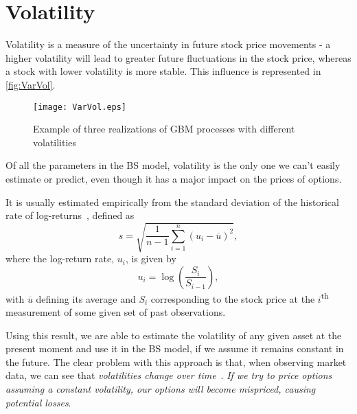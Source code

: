 
\section{Volatility}
\label{sec:vol}
Volatility is a measure of the uncertainty in future stock price movements - a higher volatility will lead to greater future fluctuations in the stock price, whereas a stock with lower volatility is more stable. This influence is represented in \autoref{fig:VarVol}.
\begin{figure}[H]
    \centering
      \texttt{[image: VarVol.eps]}
      \caption{Example of three realizations of GBM processes with different volatilities}\label{fig:VarVol}
    \end{figure}
    
Of all the parameters in the BS model, volatility is the only one we can't easily estimate or predict, even though it has a major impact on the prices of options.

It is usually estimated empirically from the standard deviation of the historical rate of log-returns~\citep{Hull}, defined as
\begin{equation}
s=\sqrt{\frac{1}{n-1}\sum_{i=1}^n(u_i-\overline{u})^2},
\end{equation}
\noindent where the log-return rate, $u_i$, is given by
\begin{equation}
u_i=\log\left(\frac{S_i}{S_{i-1}}\right),
\end{equation}
\noindent with $\overline{u}$ defining its average and $S_i$ corresponding to the stock price at the $i$\textsuperscript{th} measurement of some given set of past observations.


Using this result, we are able to estimate the volatility of any given asset at the present moment and use it in the BS model, if we assume it remains constant in the future. The clear problem with this approach is that, when observing market data, we can see that \emph{volatilities change over time}~\citep{chourdakis}. \emph{If we try to price options assuming a constant volatility, our options will become mispriced, causing potential losses}.

